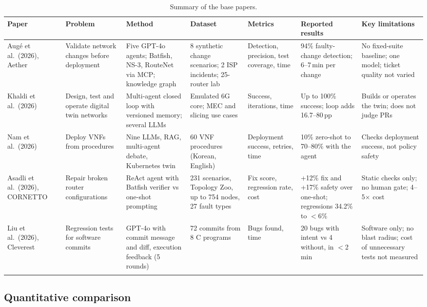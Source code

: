 \documentclass[pdflatex,iicol,sn-mathphys-num]{sn-jnl}%
\newcommand{\pp}{\,pp}
\theoremstyle{thmstyletwo}%
\begin{document}
\begin{table}[t]
\caption{Summary of the base papers.}\label{tab:basepapers}
\centering\scriptsize
\begin{tabular}{@{}L{17mm}L{17mm}L{19mm}L{19mm}L{14mm}L{19mm}L{20mm}@{}}
\toprule
Paper & Problem & Method & Dataset & Metrics & Reported results & Key limitations\\
\midrule
Aug\'e et al.\ (2026), Aether~\cite{auge2026aether} & Validate network changes before deployment & Five GPT-4o agents; Batfish, NS-3, RouteNet via MCP; knowledge graph & 8 synthetic change scenarios; 2 ISP incidents; 25-router lab & Detection, precision, test coverage, time & 94\% faulty-change detection; 6--7\,min per change & No fixed-suite baseline; one model; ticket quality not varied\\
Khaldi et al.\ (2026)~\cite{khaldi2026agentic} & Design, test and operate digital twin networks & Multi-agent closed loop with versioned memory; several LLMs & Emulated 6G core; MEC and slicing use cases & Success, iterations, time & Up to 100\% success; loop adds 16.7--80\pp & Builds or operates the twin; does not judge PRs\\
Nam et al.\ (2026)~\cite{nam2026vnf} & Deploy VNFs from procedures & Nine LLMs, RAG, multi-agent debate, Kubernetes twin & 60 VNF procedures (Korean, English) & Deployment success, retries, time & 10\% zero-shot to 70--80\% with the agent & Checks deployment success, not policy safety\\
Asadli et al.\ (2026), CORNETTO~\cite{asadli2026cornetto} & Repair broken router configurations & ReAct agent with Batfish verifier vs one-shot prompting & 231 scenarios, Topology Zoo, up to 754 nodes, 27 fault types & Fix score, regression rate, cost & +12\% fix and +17\% safety over one-shot; regressions 34.2\% to $<$6\% & Static checks only; no human gate; 4--5$\times$ cost\\
Liu et al.\ (2026), Cleverest~\cite{liu2026cleverest} & Regression tests for software commits & GPT-4o with commit message and diff, execution feedback (5 rounds) & 72 commits from 8 C programs & Bugs found, time & 20 bugs with intent vs 4 without, in $<$2\,min & Software only; no blast radius; cost of unnecessary tests not measured\\
\botrule
\end{tabular}
\end{table}

\subsection{Quantitative comparison}\label{sec:quant}
\end{document}
